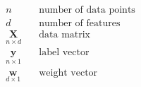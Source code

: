 \newcommand{\matrix}[1]{\mathbf{#1}}
\newcommand{\vector}[1]{\mathbf{#1}}
\begin{align*}
n \quad & \text{number of data points} \\
d \quad & \text{number of features} \\
\underset{n \times d}{\matrix{X}} \quad & \text{data matrix} \\
\underset{n \times 1}{\vector{y}} \quad & \text{label vector} \\
\underset{d \times 1}{\vector{w}} \quad & \text{weight vector}
\end{align*}
